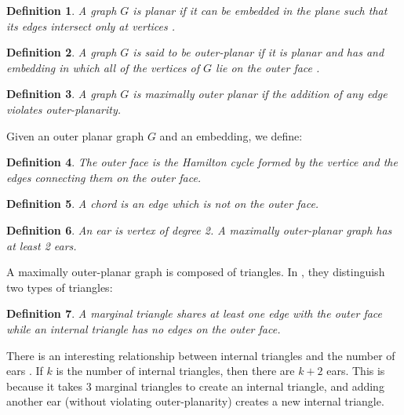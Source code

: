 \documentclass[letterpaper, 10pt]{article}
\begin{document}
\newtheorem{definition}{Definition}
\newtheorem{theorem}{Theorem}
\newtheorem{proposition}{Proposition}
\newtheorem{corollary}{Corollary}
\newtheorem{lemma}{Lemma}

\begin{definition}
A graph $G$ is \emph{planar} if it can be embedded in the plane such that its edges
intersect only at vertices \cite{bondy2008graph}.
\end{definition}

\begin{definition}
A graph $G$ is said to be \emph{outer-planar} if it is planar and has and embedding
in which all of the vertices of $G$ lie on the outer face \cite{campos2013dominating}.
\end{definition}

\begin{definition}
A graph $G$ is \emph{maximally outer planar} if the addition of any edge violates
 outer-planarity.
\end{definition}

Given an outer planar graph $G$ and an embedding, we define:

\begin{definition}
The \emph{outer face} is the Hamilton cycle formed by the vertice and the edges
connecting them on the outer face.
\end{definition}

\begin{definition}
A \emph{chord} is an edge which is not on the outer face.
\end{definition}

\begin{definition}
An \emph{ear} is vertex of degree 2. A maximally outer-planar graph has at least 2 ears.
\end{definition}

A maximally outer-planar graph is composed of triangles. In \cite{campos2013dominating},
they distinguish two types of triangles:

\begin{definition}
A \emph{marginal} triangle shares at least one edge with the outer face while
 an \emph{internal} triangle has no edges on the outer face.
\end{definition}

There is an interesting relationship between internal triangles and the number
of ears \cite{campos2013dominating}. If $k$ is the number of internal triangles, then there are $k+2$ ears.
This is because it takes 3 marginal triangles to create an internal triangle, and
adding another ear (without violating outer-planarity) creates a new internal triangle.
\end{document}
